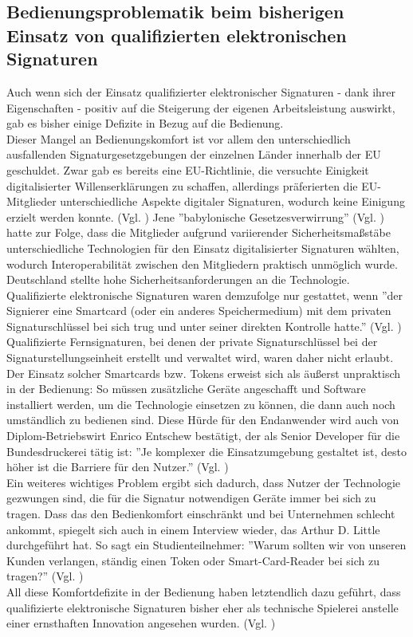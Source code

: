 \documentclass[deutsch]{lib/llncs/llncs}
\begin{document}
\subsection{Bedienungsproblematik beim bisherigen Einsatz von qualifizierten elektronischen Signaturen}
Auch wenn sich der Einsatz qualifizierter elektronischer Signaturen - dank ihrer Eigenschaften - positiv auf die Steigerung der eigenen Arbeitsleistung auswirkt, gab es bisher einige Defizite in Bezug auf die Bedienung. \\
Dieser Mangel an Bedienungskomfort ist vor allem den unterschiedlich ausfallenden Signaturgesetzgebungen der einzelnen Länder innerhalb der EU geschuldet. Zwar gab es bereits eine EU-Richtlinie, die versuchte Einigkeit digitalisierter Willenserklärungen zu schaffen, allerdings präferierten die EU-Mitglieder unterschiedliche Aspekte digitaler Signaturen, wodurch keine Einigung erzielt werden konnte. (Vgl. \cite[S. 30]{schmeh2017neue}) Jene ''babylonische Gesetzesverwirrung'' (Vgl. \cite[S. 30]{schmeh2017neue}) hatte zur Folge, dass die Mitglieder aufgrund variierender Sicherheitsmaßstäbe unterschiedliche Technologien für den Einsatz digitalisierter Signaturen wählten, wodurch Interoperabilität zwischen den Mitgliedern praktisch unmöglich wurde. \\
Deutschland stellte hohe Sicherheitsanforderungen an die Technologie. Qualifizierte elektronische Signaturen waren demzufolge nur gestattet, wenn ''der Signierer eine Smartcard (oder ein anderes Speichermedium) mit dem privaten Signaturschlüssel bei sich trug und unter seiner direkten Kontrolle hatte.'' (Vgl. \cite[S. 30]{schmeh2017neue}) Qualifizierte Fernsignaturen, bei denen der private Signaturschlüssel bei der Signaturstellungseinheit erstellt und verwaltet wird, waren daher nicht erlaubt. \\
Der Einsatz solcher Smartcards bzw. Tokens erweist sich als äußerst unpraktisch in der Bedienung: So müssen zusätzliche Geräte angeschafft und Software installiert werden, um die Technologie einsetzen zu können, die dann auch noch umständlich zu bedienen sind. Diese Hürde für den Endanwender wird auch von Diplom-Betriebswirt Enrico Entschew bestätigt, der als Senior Developer für die Bundesdruckerei tätig ist: ''Je komplexer die Einsatzumgebung gestaltet ist, desto höher ist die Barriere für den Nutzer.'' (Vgl. \cite[S. 232]{entschew2016neue}) \\
Ein weiteres wichtiges Problem ergibt sich dadurch, dass Nutzer der Technologie gezwungen sind, die für die Signatur notwendigen Geräte immer bei sich zu tragen. Dass das den Bedienkomfort einschränkt und bei Unternehmen schlecht ankommt, spiegelt sich auch in einem Interview wieder, das Arthur D. Little durchgeführt hat. So sagt ein Studienteilnehmer: ''Warum sollten wir von unseren Kunden verlangen, ständig einen Token oder Smart-Card-Reader bei sich zu tragen?'' (Vgl. \cite[S. 5]{arthurdlittle2015digitale}) \\
All diese Komfortdefizite in der Bedienung haben letztendlich dazu geführt, dass qualifizierte elektronische Signaturen bisher eher als technische Spielerei anstelle einer ernsthaften Innovation angesehen wurden.  (Vgl. \cite[S. 29]{schmeh2017neue})
\end{document}
